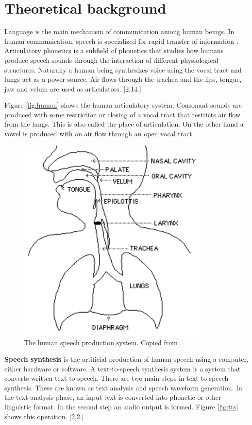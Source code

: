 \documentclass[11pt,a4paper,oneside,article]{memoir}
\begin{document}
\clearpage	
\chapter{Theoretical background}
Language is the main mechanism of communication among human beings. In human communication, speech is specialized for rapid transfer of information \cite{vocal}. Articulatory phonetics is a subfield of phonetics that studies how humans produce speech sounds through the interaction of different physiological structures. Naturally a human being synthesizes voice using the vocal tract and lungs act as a power source. Air flows through the trachea and the lips, tongue, jaw and velum are used as articulators. [2,14.]

Figure \vref{fig:human} shows the human articulatory system. Consonant sounds are produced with some restriction or closing of a vocal tract that restricts air flow from the lungs. This is also called the place of articulation. On the other hand a vowel is produced with an air flow through an open vocal tract.

\begin{figure}[h]
  \includegraphics[width=10cm]{human}
  \caption{The human speech production system. Copied from \cite{vocal}.}
  \label{fig:human}
\end{figure}

\newpage
\textbf{Speech synthesis} is the artificial production of human speech using a computer, either hardware or software. A text-to-speech synthesis system is a system that converts written text-to-speech. There are two main steps in text-to-speech-synthesis. These are known as text analysis and speech waveform generation. In the text analysis phase, an input text is converted into phonetic or other linguistic format. In the second step an audio output is formed. Figure \vref{fig:tts} shows this operation. [2,2.]
\end{document}

